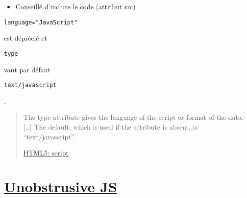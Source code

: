 \begin{otherlanguage}{english}

\begin{Shaded}
\begin{Highlighting}[]
\end{Highlighting}
\end{Shaded}

\end{otherlanguage}

\begin{itemize}
\tightlist
\item
  Conseillé d'inclure le code (attribut src)
\end{itemize}

\begin{otherlanguage}{english}

\begin{Shaded}
\begin{Highlighting}[]
\end{Highlighting}
\end{Shaded}

\end{otherlanguage}

\begin{otherlanguage}{english}\texttt{language="JavaScript"}\end{otherlanguage}
est déprécié et
\begin{otherlanguage}{english}\texttt{type}\end{otherlanguage} vaut par
défaut
\begin{otherlanguage}{english}\texttt{text/javascript}\end{otherlanguage}.

\begin{quote}
The type attribute gives the language of the script or format of the
data. {[}\ldots{}{]} The default, which is used if the attribute is
absent, is ``text/javascript''.

\href{https://www.w3.org/TR/html5/scripting-1.html\#the-script-element}{HTML5:
script}
\end{quote}

\hypertarget{unobstrusive-js}{%
\section{\texorpdfstring{\href{https://en.wikipedia.org/wiki/Unobtrusive_JavaScript}{Unobstrusive
JS}}{Unobstrusive JS}}\label{unobstrusive-js}}

